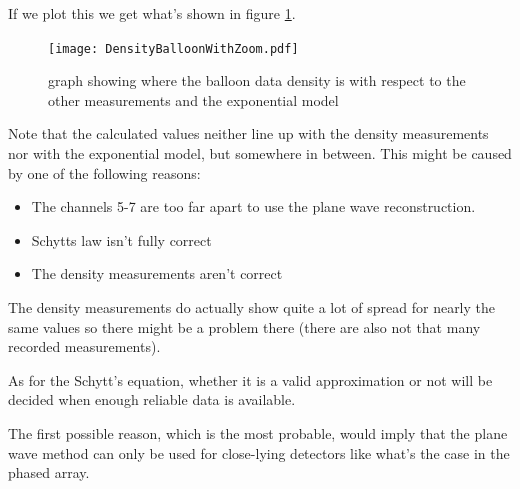 If we plot this we get what's shown in figure
\ref{fig:BalloonDensity6And7}.
\begin{figure}
	\centering
	\texttt{[image: DensityBalloonWithZoom.pdf]}
	\caption{graph showing where the balloon data density is with
	respect to the other measurements and the exponential model}
	\label{fig:BalloonDensity6And7}
\end{figure}
Note that the calculated values neither line up with the density
measurements nor with the exponential model, but somewhere
in between. This might be caused by one of the following reasons:
\begin{itemize}
	\item The channels 5-7 are too far apart to use the plane
		wave reconstruction.
	\item Schytts law isn't fully correct
	\item The density measurements aren't correct
\end{itemize}
The density measurements do actually show quite a lot of spread for nearly
the same values so there might be a problem there (there are also not that many
recorded measurements).  

As for the Schytt's equation, whether it is a valid approximation or not will be
decided when enough reliable data is available.  

The first possible reason, which is the most probable, would imply that the
plane wave method can only be used for close-lying detectors like what's the
case in the phased array.
